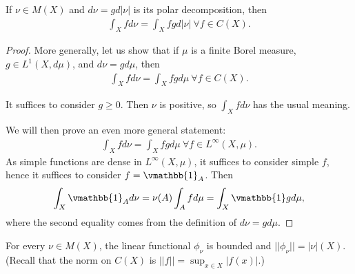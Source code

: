 \begin{lemma}
    If \(\nu\in M(X)\) and \(d\nu = gd|\nu|\) is its polar decomposition, then
    \begin{align*}
        \int_Xfd\nu = \int_X fgd|\nu| \ \forall f\in C(X).
    \end{align*}
\end{lemma}
\ifdetailed
\begin{proof}
    More generally, let us show that if \(\mu\) is a finite Borel measure, \(g\in L^1(X,d\mu)\), and \(d\nu = gd\mu\), then
    \begin{align*}
        \int_X fd\nu = \int_X fgd\mu \ \forall f\in C(X).
    \end{align*}
    
    It suffices to consider \(g\geq 0\). Then \(\nu\) is positive, so \(\int_X fd\nu\) has the usual meaning.

    We will then prove an even more general statement:
    \begin{align*}
        \int_X fd\nu = \int_X fg d\mu \ \forall f\in L^{\infty}(X,\mu).
    \end{align*}
    As simple functions are dense in \(L^{\infty}(X,\mu)\), it suffices to consider simple \(f\), hence it suffices to consider \(f=\vmathbb{1}_A\). Then
    \begin{align*}
        \int_X\vmathbb{1}_Ad\nu = \nu(A)\int_A fd\mu = \int_X \vmathbb{1}gd\mu,
    \end{align*}
    where the second equality comes from the definition of \(d\nu = gd\mu\).
\end{proof}
\fi 
\begin{lemma}
    For every \(\nu\in M(X)\), the linear functional \(\phi_{\nu}\) is bounded and \(||\phi_{\nu}|| = |\nu|(X)\). (Recall that the norm on \(C(X)\) is \(||f|| = \sup_{x\in X}|f(x)|\).)
\end{lemma}
\ifdetailed
